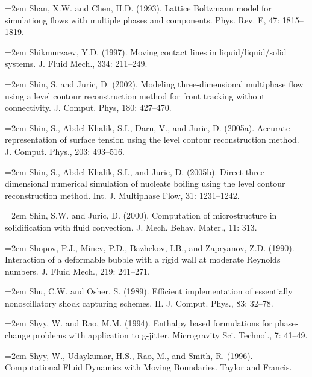 \documentclass[11pt,a4paper,openany,fontset=none]{ctexbook}
\begin{document}
\par\hangindent=2em Shan, X.W. and Chen, H.D. (1993). Lattice Boltzmann model for simulationg flows with multiple phases and components. Phys. Rev. E, 47: 1815--1819.

\par\hangindent=2em Shikmurzaev, Y.D. (1997). Moving contact lines in liquid/liquid/solid systems. J. Fluid Mech., 334: 211--249.

\par\hangindent=2em Shin, S. and Juric, D. (2002). Modeling three-dimensional multiphase flow using a level contour reconstruction method for front tracking without connectivity. J. Comput. Phys, 180: 427--470.

\par\hangindent=2em Shin, S., Abdel-Khalik, S.I., Daru, V., and Juric, D. (2005a). Accurate representation of surface tension using the level contour reconstruction method. J. Comput. Phys., 203: 493--516.

\par\hangindent=2em Shin, S., Abdel-Khalik, S.I., and Juric, D. (2005b). Direct three-dimensional numerical simulation of nucleate boiling using the level contour reconstruction method. Int. J. Multiphase Flow, 31: 1231--1242.

\par\hangindent=2em Shin, S.W. and Juric, D. (2000). Computation of microstructure in solidification with fluid convection. J. Mech. Behav. Mater., 11: 313.

\par\hangindent=2em Shopov, P.J., Minev, P.D., Bazhekov, I.B., and Zapryanov, Z.D. (1990). Interaction of a deformable bubble with a rigid wall at moderate Reynolds numbers. J. Fluid Mech., 219: 241--271.


\par\hangindent=2em Shu, C.W. and Osher, S. (1989). Efficient implementation of essentially nonoscillatory shock capturing schemes, II. J. Comput. Phys., 83: 32--78.

\par\hangindent=2em Shyy, W. and Rao, M.M. (1994). Enthalpy based formulations for phase-change problems with application to g-jitter. Microgravity Sci. Technol., 7: 41--49.

\par\hangindent=2em Shyy, W., Udaykumar, H.S., Rao, M., and Smith, R. (1996). Computational Fluid Dynamics with Moving Boundaries. Taylor and Francis.
\end{document}
